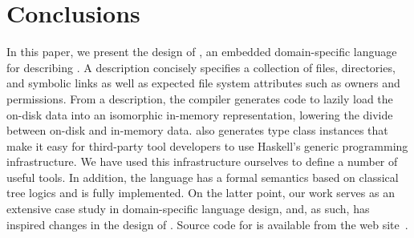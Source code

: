 \section{Conclusions}
\label{sec:conclusion}


In this paper, we present the design of \forest{}, an embedded
domain-specific language for describing \filestores{}.  A \forest{}
description concisely specifies a collection of files, directories,
and symbolic links as well as expected file system attributes such as
owners and permissions.  From a description, the \forest{} compiler
generates code to lazily load the on-disk data into an isomorphic
in-memory representation, lowering the divide between on-disk and
in-memory data.  
\forest{} also generates type class instances that make it 
easy for third-party tool developers to use
Haskell's generic programming infrastructure.  We have used this
infrastructure ourselves to define a number of useful tools. 
In addition, the language has a formal semantics based on classical tree logics and is
fully implemented.  On the latter point, our work 
serves as an extensive case study in domain-specific
language design, and, as such, has inspired changes in the design of
\template{}.  Source code for \forest{} is available from the
\forest{} web site~\cite{forest-web-site}.

